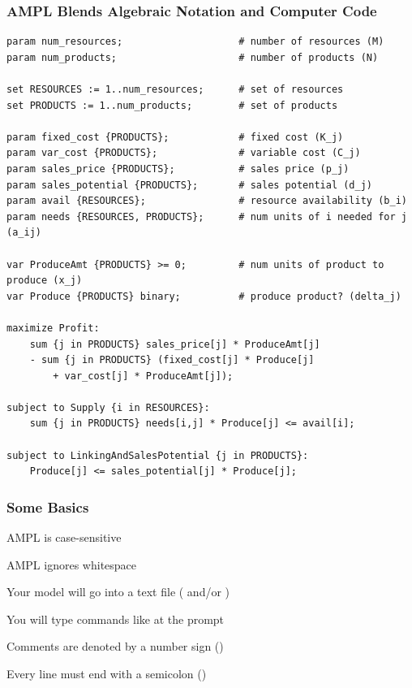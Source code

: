 \begin{frame}[fragile] %

	\frametitle{AMPL Blends Algebraic Notation and Computer Code}
	
	\begin{lstlisting}
param num_resources;					# number of resources (M)
param num_products;						# number of products (N)

set RESOURCES := 1..num_resources;		# set of resources
set PRODUCTS := 1..num_products;		# set of products

param fixed_cost {PRODUCTS};			# fixed cost (K_j)
param var_cost {PRODUCTS};				# variable cost (C_j)
param sales_price {PRODUCTS};			# sales price (p_j)
param sales_potential {PRODUCTS};		# sales potential (d_j)
param avail {RESOURCES};				# resource availability (b_i)
param needs {RESOURCES, PRODUCTS};		# num units of i needed for j (a_ij)

var ProduceAmt {PRODUCTS} >= 0;			# num units of product to produce (x_j)
var Produce {PRODUCTS} binary;			# produce product? (delta_j)

maximize Profit:
	sum {j in PRODUCTS} sales_price[j] * ProduceAmt[j] 
	- sum {j in PRODUCTS} (fixed_cost[j] * Produce[j] 
		+ var_cost[j] * ProduceAmt[j]);
	
subject to Supply {i in RESOURCES}:
	sum {j in PRODUCTS} needs[i,j] * Produce[j] <= avail[i];
	
subject to LinkingAndSalesPotential {j in PRODUCTS}:
	Produce[j] <= sales_potential[j] * Produce[j];
	\end{lstlisting}

\end{frame}


\begin{frame}[fragile]

	\frametitle{Some Basics}
	
	\bit
	\item AMPL is case-sensitive
	\item AMPL ignores whitespace
	\item Your model will go into a text file ( and/or )
	\item You will type commands like  at the  prompt
	\item Comments are denoted by a number sign (\myinline{\#}) 
	\item Every line must end with a  semicolon (\myinline{;})
	\eit

\end{frame}


